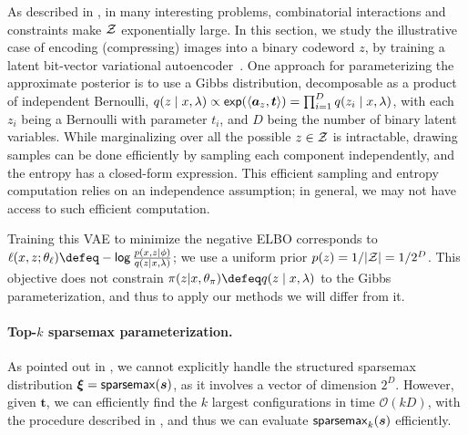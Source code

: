 As described in , in many interesting problems,
combinatorial interactions and constraints make $\mathcal{Z}$ exponentially
large. In this section, we study the illustrative case of encoding
(compressing) images into a binary codeword $z$, by training a latent
bit-vector variational autoencoder~\citep{GumbelSoftmax,
    mnih2014neural}. One approach for parameterizing the approximate
posterior is to use a Gibbs distribution, decomposable as a product
of independent Bernoulli, $q(z \mid x, \lambda) \propto
    \operatorname*{\mathsf{exp}}(\langle\bm{a}_z,\bm{t}\rangle) = \prod_{i=1}^D q(z_i \mid x, \lambda)$,
with each $z_i$ being a Bernoulli with parameter $t_i$, and $D$ being
the number of binary latent variables. While marginalizing over all the
possible $z \in \mathcal{Z}$ is intractable, drawing samples can be done
efficiently by sampling each component independently, and the entropy
has a closed-form expression.
This efficient sampling and entropy computation relies on an independence
assumption; in general, we may not have access to such efficient
computation.

\begin{sloppypar}
    Training this VAE to minimize the negative ELBO corresponds to
    $\ell(x, z; \theta_\ell) \defeq - \log \frac{p(x, z | \phi)}{q(z | x,
            \lambda)} $; we use a uniform prior $p(z)=1/|\mathcal{Z}|=1/{2^D}$. This
    objective does not constrain $\pi(z| x,\theta_\pi) \defeq q(z \mid x,
        \lambda)$ to the Gibbs parameterization, and thus to apply our
    methods we will differ from it.
\end{sloppypar}

\paragraph*{Top-{\boldmath $k$} sparsemax parameterization.} As pointed
out in , we cannot explicitly handle the
structured sparsemax distribution $\bm{\xi} = \operatorname*{\mathsf{sparsemax}}(\bm{s})$, as it
involves a vector of dimension $2^D$. However, given $\bm{t}$, we can
efficiently find the $k$ largest configurations in time
$\mathcal{O}(kD)$, with the procedure described in
, and thus we can evaluate $\operatorname{\mathsf{sparsemax}_\text{$k$}}(\bm{s})$
efficiently.

